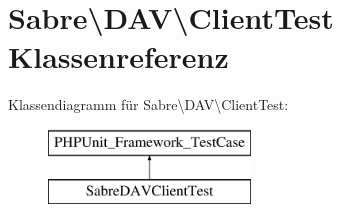 \hypertarget{class_sabre_1_1_d_a_v_1_1_client_test}{}\section{Sabre\textbackslash{}D\+AV\textbackslash{}Client\+Test Klassenreferenz}
\label{class_sabre_1_1_d_a_v_1_1_client_test}
Klassendiagramm für Sabre\textbackslash{}D\+AV\textbackslash{}Client\+Test\+:\begin{figure}[H]
\begin{center}
\leavevmode
\includegraphics[height=2.000000cm]{class_sabre_1_1_d_a_v_1_1_client_test}
\end{center}
\end{figure}
